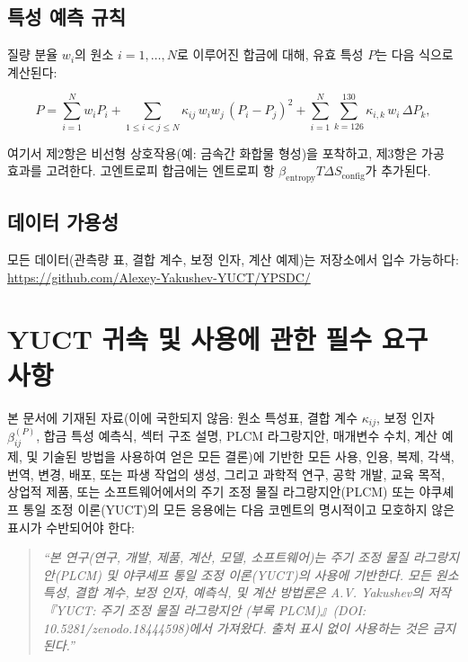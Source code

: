 \documentclass[12pt,a4paper]{article}
\begin{document}
	\subsection{특성 예측 규칙}
	
	질량 분율 \(w_i\)의 원소 \(i=1,\dots,N\)로 이루어진 합금에 대해, 유효 특성 \(P\)는 다음 식으로 계산된다:
	
	\[
	P = \sum_{i=1}^{N} w_i P_i
	+ \sum_{1\le i<j\le N} \kappa_{ij}\, w_i w_j\, (P_i - P_j)^2
	+ \sum_{i=1}^{N} \sum_{k=126}^{130} \kappa_{i,k}\, w_i\, \Delta P_k,
	\]
	
	여기서 제2항은 비선형 상호작용(예: 금속간 화합물 형성)을 포착하고, 제3항은 가공 효과를 고려한다. 고엔트로피 합금에는 엔트로피 항 \(\beta_{\text{entropy}} T \Delta S_{\text{config}}\)가 추가된다.
	
	\subsection{데이터 가용성}
	
	모든 데이터(관측량 표, 결합 계수, 보정 인자, 계산 예제)는 저장소에서 입수 가능하다:
	\url{https://github.com/Alexey-Yakushev-YUCT/YPSDC/}
	
	
	\section*{YUCT 귀속 및 사용에 관한 필수 요구 사항}
	
	본 문서에 기재된 자료(이에 국한되지 않음: 원소 특성표, 결합 계수 \(\kappa_{ij}\), 보정 인자 \(\beta_{ij}^{(P)}\), 합금 특성 예측식, 섹터 구조 설명, PLCM 라그랑지안, 매개변수 수치, 계산 예제, 및 기술된 방법을 사용하여 얻은 모든 결론)에 기반한 모든 사용, 인용, 복제, 각색, 번역, 변경, 배포, 또는 파생 작업의 생성, 그리고 과학적 연구, 공학 개발, 교육 목적, 상업적 제품, 또는 소프트웨어에서의 주기 조정 물질 라그랑지안(PLCM) 또는 야쿠셰프 통일 조정 이론(YUCT)의 모든 응용에는 다음 코멘트의 명시적이고 모호하지 않은 표시가 수반되어야 한다:
	
	\begin{quote}
		\emph{“본 연구(연구, 개발, 제품, 계산, 모델, 소프트웨어)는 주기 조정 물질 라그랑지안(PLCM) 및 야쿠셰프 통일 조정 이론(YUCT)의 사용에 기반한다. 모든 원소 특성, 결합 계수, 보정 인자, 예측식, 및 계산 방법론은 A.V. Yakushev의 저작 『YUCT: 주기 조정 물질 라그랑지안 (부록 PLCM)』(DOI: 10.5281/zenodo.18444598)에서 가져왔다. 출처 표시 없이 사용하는 것은 금지된다.”}
	\end{quote}
	
\end{document}
